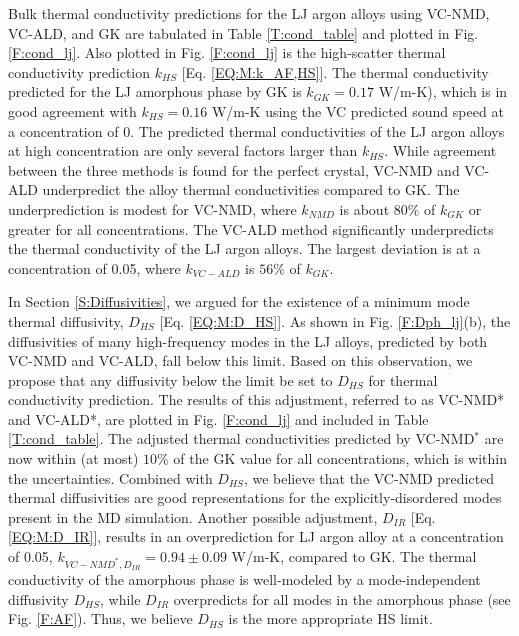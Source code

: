 \documentclass[aps,prb,onecolumn,preprint,footinbib,superscriptaddress,amsmath,amssymb,floatfix]{revtex4}
\begin{document}
Bulk thermal conductivity predictions for the LJ argon alloys using  
VC-NMD, VC-ALD, and GK are tabulated in Table \ref{T:cond_table} 
and plotted in Fig. \ref{F:cond_lj}. Also plotted 
in Fig. \ref{F:cond_lj} is the high-scatter 
thermal conductivity prediction $k_{HS}$ 
[Eq. \eqref{EQ:M:k_AF,HS}]. The thermal conductivity predicted 
for the LJ amorphous phase by GK is $k_{GK} = 0.17$ W/m-K),\cite{vc_fn6_2013} 
which is in good agreement with $k_{HS} = 0.16$ W/m-K using the 
VC predicted sound speed at a concentration of 0.  
The predicted thermal conductivities of the LJ argon alloys at high 
concentration are only several factors larger than $k_{HS}$.  
While agreement between the three methods is found for the perfect 
crystal, VC-NMD and VC-ALD underpredict the alloy thermal 
conductivities compared to GK. 
The underprediction is modest for VC-NMD, where $k_{NMD}$ is about 
$80\%$ of $k_{GK}$ or greater for all concentrations. The VC-ALD method 
significantly underpredicts the thermal conductivity of the LJ argon alloys. 
The largest deviation is at a concentration of 0.05, where 
$k_{VC-ALD}$ is $56\%$ of $k_{GK}$.

In Section \ref{S:Diffusivities}, 
we argued for the existence of a minimum mode thermal 
diffusivity, $D_{HS}$ [Eq. \eqref{EQ:M:D_HS}]. 
As shown in Fig. \ref{F:Dph_lj}(b), the diffusivities of 
many high-frequency modes in the LJ alloys, predicted by both VC-NMD 
and VC-ALD, fall below this limit.  Based on this observation, we propose 
that any diffusivity below the limit be set to $D_{HS}$ 
for thermal conductivity prediction. 
The results of this adjustment, 
referred to as VC-NMD* and VC-ALD*, are plotted in Fig. \ref{F:cond_lj} 
and included in Table \ref{T:cond_table}.  
The adjusted thermal conductivities predicted by VC-NMD$^*$ are now  
within (at most) $10\%$ of the GK value for all concentrations, which
is within the uncertainties. 
Combined with $D_{HS}$, we believe that the VC-NMD predicted thermal 
diffusivities are good representations for the explicitly-disordered 
modes present in the MD simulation. Another possible 
adjustment, $D_{IR}$ [Eq. \eqref{EQ:M:D_IR}], results in an overprediction 
for LJ argon alloy at a concentration of 0.05, 
$k_{VC-NMD^*,D_{IR}} = 0.94 \pm 0.09$ W/m-K, compared to GK. The thermal 
conductivity of the amorphous phase is well-modeled by a mode-independent 
diffusivity $D_{HS}$, while $D_{IR}$ overpredicts for all modes in the 
amorphous phase (see Fig. \ref{F:AF}). 
Thus, we believe $D_{HS}$ is the more appropriate HS limit. 
\end{document}
